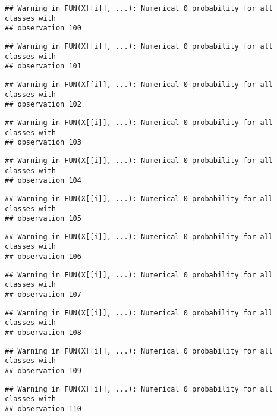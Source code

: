 \documentclass[
]{article}
\begin{document}
\begin{verbatim}
## Warning in FUN(X[[i]], ...): Numerical 0 probability for all classes with
## observation 100
\end{verbatim}

\begin{verbatim}
## Warning in FUN(X[[i]], ...): Numerical 0 probability for all classes with
## observation 101
\end{verbatim}

\begin{verbatim}
## Warning in FUN(X[[i]], ...): Numerical 0 probability for all classes with
## observation 102
\end{verbatim}

\begin{verbatim}
## Warning in FUN(X[[i]], ...): Numerical 0 probability for all classes with
## observation 103
\end{verbatim}

\begin{verbatim}
## Warning in FUN(X[[i]], ...): Numerical 0 probability for all classes with
## observation 104
\end{verbatim}

\begin{verbatim}
## Warning in FUN(X[[i]], ...): Numerical 0 probability for all classes with
## observation 105
\end{verbatim}

\begin{verbatim}
## Warning in FUN(X[[i]], ...): Numerical 0 probability for all classes with
## observation 106
\end{verbatim}

\begin{verbatim}
## Warning in FUN(X[[i]], ...): Numerical 0 probability for all classes with
## observation 107
\end{verbatim}

\begin{verbatim}
## Warning in FUN(X[[i]], ...): Numerical 0 probability for all classes with
## observation 108
\end{verbatim}

\begin{verbatim}
## Warning in FUN(X[[i]], ...): Numerical 0 probability for all classes with
## observation 109
\end{verbatim}

\begin{verbatim}
## Warning in FUN(X[[i]], ...): Numerical 0 probability for all classes with
## observation 110
\end{verbatim}
\end{document}
